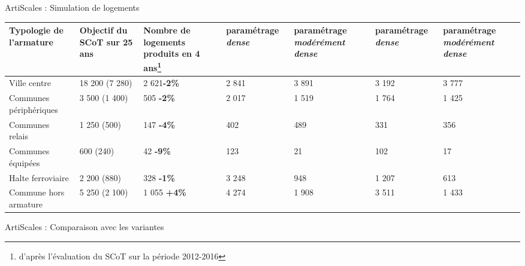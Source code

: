 \documentclass[xcolor=table]{beamer}
\begin{document}
\begin{frame}{ArtiScales : Simulation de logements}
{\begin{table}[h]
\begin{center}
\begin{tabular}{m{2.3cm}m{1.4cm}m{1.05cm}m{1cm}m{1cm}m{1cm}m{1cm}}
					\rowcolor[gray]{0.9}
					Typologie de l'armature &
					Objectif du SCoT sur 25 ans&
					Nombre de logements produits en 4 ans\footnote{d'après l'évaluation du SCoT sur la période 2012-2016}&
					\cellcolor[gray]{0.8}paramétrage \textit{dense} & \cellcolor[gray]{0.8}paramétrage \textit{modérément dense}& \cellcolor[gray]{0.8}paramétrage \textit{dense} & \cellcolor[gray]{0.8}paramétrage \textit{modérément dense} \\ \hline
					
					\hline
					Ville centre&18 200 (7 280)&2 621\textbf{-2\%}&2 841&3 891&3 192&3 777\\\hline
					\rowcolor[gray]{0.9}Communes périphériques&3 500 (1 400)&505 \textbf{-2\%}&2 017&1 519&1 764&1 425\\\hline
					Communes relais &1 250 (500)&147 \textbf{-4\%}&402&489&331&356\\\hline
					\rowcolor{green} Communes équipées&600 (240)&42 \textbf{-9\%}&123&21&102&17\\\hline
					Halte ferroviaire&2 200 (880)&328 \textbf{-1\%}&3 248&948&1 207&613\\\hline
					\rowcolor[gray]{0.9}Commune hors armature&5 250 (2 100)&1 055 \textbf{+4\%}&4 274&1 908&3 511&1 433\\\hline 
				\end{tabular}
			\end{center}
	\end{table}}
\end{frame}


\begin{frame}{ArtiScales : Comparaison avec les variantes}
\hspace*{-0.9cm}
\end{frame}
\end{document}
